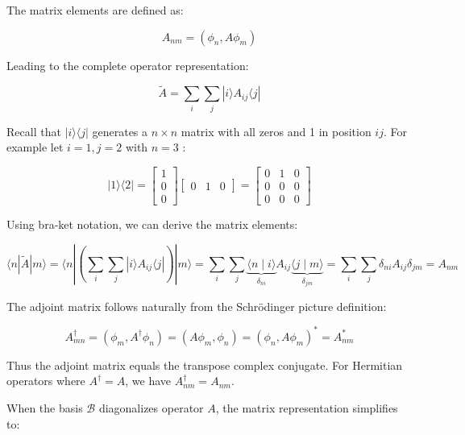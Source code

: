 \documentclass[italian]{HKNdocument}
\begin{document}
The matrix elements are defined as:

\begin{equation}
A_{n m}=\left(\phi_{n}, A \phi_{m}\right)
\end{equation}

Leading to the complete operator representation:

\begin{equation}
\tilde{A}=\sum_{i} \sum_{j}|i\rangle A_{i j}\langle j|
\end{equation}


Recall that $|i\rangle\langle j|$ generates a $n \times n$ matrix with all zeros and 1 in position $i j$. For example let $i=1, j=2$ with $n=3$ :

\[
|1\rangle\langle 2|=\left[\begin{array}{l}
1  \\
0 \\
0
\end{array}\right]\left[\begin{array}{lll}
0 & 1 & 0
\end{array}\right]=\left[\begin{array}{lll}
0 & 1 & 0 \\
0 & 0 & 0 \\
0 & 0 & 0
\end{array}\right]
\]

Using bra-ket notation, we can derive the matrix elements:

\begin{equation}
\langle n| \tilde{A}|m\rangle=\langle n|\left(\sum_{i} \sum_{j}|i\rangle A_{i j}\langle j|\right)|m\rangle=\sum_{i} \sum_{j} \underbrace{\langle n \mid i\rangle}_{\delta_{n i}} A_{i j} \underbrace{\langle j \mid m\rangle}_{\delta_{j m}}=\sum_{i} \sum_{j} \delta_{n i} A_{i j} \delta_{j m}=A_{n m}
\end{equation}

The adjoint matrix follows naturally from the Schrödinger picture definition:

\begin{equation}
A_{m n}^{\dagger}=\left(\phi_{m}, A^{\dagger} \phi_{n}\right)=\left(A \phi_{m}, \phi_{n}\right)=\left(\phi_{n}, A \phi_{m}\right)^{*}=A_{n m}^{*}
\end{equation}

Thus the adjoint matrix equals the transpose complex conjugate. For Hermitian operators where $A^{\dagger}=A$, we have $A_{n m}^{\dagger}=A_{n m}$.

When the basis $\mathcal{B}$ diagonalizes operator $A$, the matrix representation simplifies to:
\end{document}
